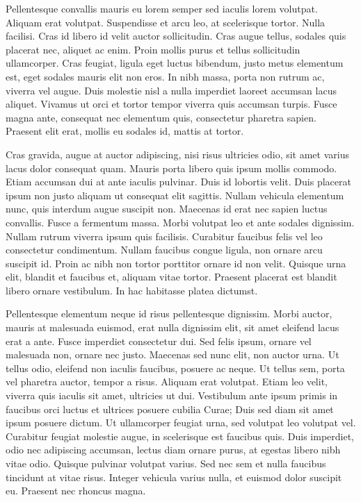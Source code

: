 Pellentesque convallis mauris eu lorem semper sed iaculis lorem volutpat.
Aliquam erat volutpat.
Suspendisse et arcu leo, at scelerisque tortor.
Nulla facilisi.
Cras id libero id velit auctor sollicitudin.
Cras augue tellus, sodales quis placerat nec, aliquet ac enim.
Proin mollis purus et tellus sollicitudin ullamcorper.
Cras feugiat, ligula eget luctus bibendum, justo metus elementum est, eget sodales mauris elit non eros.
In nibh massa, porta non rutrum ac, viverra vel augue.
Duis molestie nisl a nulla imperdiet laoreet accumsan lacus aliquet.
Vivamus ut orci et tortor tempor viverra quis accumsan turpis.
Fusce magna ante, consequat nec elementum quis, consectetur pharetra sapien.
Praesent elit erat, mollis eu sodales id, mattis at tortor.

Cras gravida, augue at auctor adipiscing, nisi risus ultricies odio, sit amet varius lacus dolor consequat quam.
Mauris porta libero quis ipsum mollis commodo.
Etiam accumsan dui at ante iaculis pulvinar.
Duis id lobortis velit.
Duis placerat ipsum non justo aliquam ut consequat elit sagittis.
Nullam vehicula elementum nunc, quis interdum augue suscipit non.
Maecenas id erat nec sapien luctus convallis.
Fusce a fermentum massa.
Morbi volutpat leo et ante sodales dignissim.
Nullam rutrum viverra ipsum quis facilisis.
Curabitur faucibus felis vel leo consectetur condimentum.
Nullam faucibus congue ligula, non ornare arcu suscipit id.
Proin ac nibh non tortor porttitor ornare id non velit.
Quisque urna elit, blandit et faucibus et, aliquam vitae tortor.
Praesent placerat est blandit libero ornare vestibulum.
In hac habitasse platea dictumst.

Pellentesque elementum neque id risus pellentesque dignissim.
Morbi auctor, mauris at malesuada euismod, erat nulla dignissim elit, sit amet eleifend lacus erat a ante.
Fusce imperdiet consectetur dui.
Sed felis ipsum, ornare vel malesuada non, ornare nec justo.
Maecenas sed nunc elit, non auctor urna.
Ut tellus odio, eleifend non iaculis faucibus, posuere ac neque.
Ut tellus sem, porta vel pharetra auctor, tempor a risus.
Aliquam erat volutpat.
Etiam leo velit, viverra quis iaculis sit amet, ultricies ut dui.
Vestibulum ante ipsum primis in faucibus orci luctus et ultrices posuere cubilia Curae; Duis sed diam sit amet ipsum posuere dictum.
Ut ullamcorper feugiat urna, sed volutpat leo volutpat vel.
Curabitur feugiat molestie augue, in scelerisque est faucibus quis.
Duis imperdiet, odio nec adipiscing accumsan, lectus diam ornare purus, at egestas libero nibh vitae odio.
Quisque pulvinar volutpat varius.
Sed nec sem et nulla faucibus tincidunt at vitae risus.
Integer vehicula varius nulla, et euismod dolor suscipit eu.
Praesent nec rhoncus magna.

